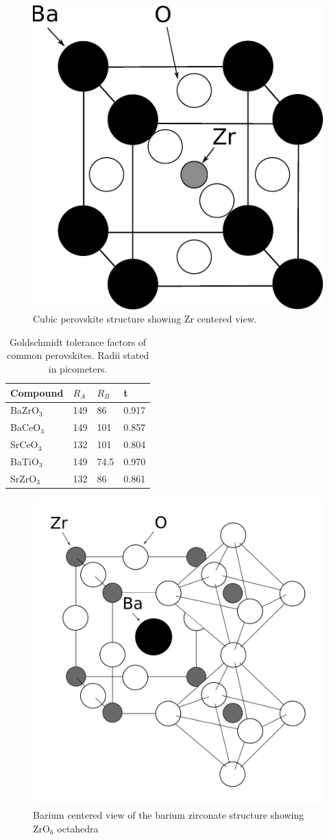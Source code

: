 \begin{figure}
    \centering
    \includegraphics[width=.4\linewidth]{Figures/BaZrO_3-Zr-center.pdf}
    \caption[Cubic perovskite structure]{Cubic perovskite structure showing Zr centered view.}
    \label{back:fig:perovskite}
\end{figure}

\begin{table}
\centering
\caption{Goldschmidt tolerance factors of common perovskites. Radii stated in picometers.}
\label{back:table:goldschmidt}
\begin{tabular}{ llll }
\hline
 Compound & $R_A$ & $R_B$ & t \\
\hline
\hline
 BaZrO$_3$ & 149 & 86 & 0.917 \\
 BaCeO$_3$ & 149 & 101 & 0.857 \\
 SrCeO$_3$ & 132 & 101 & 0.804 \\
 BaTiO$_3$ & 149 & 74.5 & 0.970 \\
 SrZrO$_3$ & 132 & 86 & 0.861 \\
\hline
\end{tabular}
\end{table}

\begin{figure}
    \centering
    \includegraphics[width=.55\linewidth]{Figures/BaZrO_3-Zr-octahedra.pdf}
    \caption{Barium centered view of the barium zirconate structure showing ZrO$_6$ octahedra}
    \label{back:fig:octahedra}
\end{figure}

